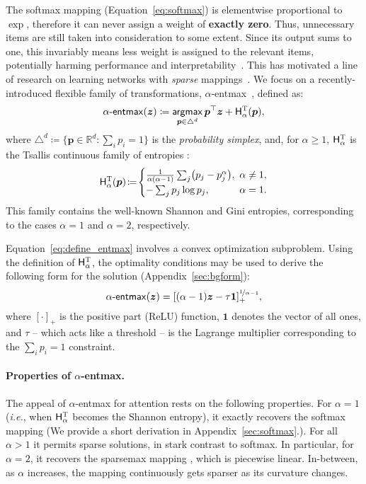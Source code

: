 \documentclass[11pt,a4paper]{article}
\makeatletter
\newcommand*{\ie}{\textit{i.\hspace{.07em}e.}\@\xspace}
\newcommand{\reals}{\mathbb{R}}
\newcommand{\simplex}{\triangle}
\newcommand\pp{p}
\newcommand\p{\bm{\pp}}
\newcommand\xx{z}
\newcommand\x{\bm{\xx}}
\newcommand{\eqnref}[1]{Equation~\ref{eq:#1}}
\newcommand{\HHt}{\mathsf{H}^{\textsc{T}}}
\newcommand{\ones}{\bm{1}}
\newcommand{\appref}[1]{Appendix~\ref{sec:#1}}
\newcommand\thresh{\tau}
\DeclareMathOperator*{\argmax}{\mathsf{argmax}}
\newcommand*\entmaxtext{entmax\xspace}
\newcommand*\aentmax[1][\alpha]{\mathop{\mathsf{#1}\textnormal{-}\mathsf{\entmaxtext}}}
\makeatother
\begin{document}
The softmax mapping (Equation~\ref{eq:softmax}) is elementwise
proportional to $\exp$, therefore it can never assign a weight of
\textbf{exactly zero}. Thus, unnecessary items are still taken into
consideration to some extent. Since its output sums to one, this
invariably means less weight is assigned to the relevant items,
potentially harming performance and
interpretability~\citep{jain2019attention}. This has motivated a line
of research on learning networks with \emph{sparse}
mappings~\citep{sparsemax,fusedmax,louizos,shao2019ssn}. We focus on
a recently-introduced flexible family of transformations,
$\alpha$-\entmaxtext~\citep{blondel2019learning,entmax}, defined as:
\begin{equation}\label{eq:define_entmax}
    \aentmax(\bm{z}) \coloneqq
    \argmax_{\p \in \simplex^d} \bm{p}^\top\bm{z} + \HHt_{\alpha}(\bm{p}),
\end{equation}
where $\simplex^d \coloneqq
\{\p \in \reals^d:\sum_{i} \pp_i = 1\}$
is the \emph{probability simplex}, and, for $\alpha\geq1$,
$\HHt_\alpha$ is the Tsallis continuous family of entropies
\citep{Tsallis1988}:
\begin{equation}\label{eq:tsallisdef}
    \HHt_{\alpha}(\bm{p})\!\coloneqq\!
\begin{cases}
\frac{1}{\alpha(\alpha-1)}\sum_j\!\left(p_j - p_j^\alpha\right)\!, &
\!\!\!\alpha \ne 1,\\
-\sum_j \pp_j \log \pp_j, &
\!\!\!\alpha = 1.
\end{cases}
\end{equation}
This family contains the well-known Shannon and Gini entropies,
corresponding to the cases $\alpha=1$ and $\alpha=2$, respectively.

\eqnref{define_entmax} involves a convex optimization subproblem. Using the
definition of $\HHt_\alpha$, the optimality conditions may be used to derive the
following form for the solution (\appref{bgform}):
\begin{equation}\label{eq:entmax_form}
\aentmax(\x) = [(\alpha - 1){\x} - \thresh \ones]_+^{\nicefrac{1}{\alpha-1}},
\end{equation}
where $[\cdot]_+$ is
the positive part (ReLU) function, $\bm{1}$ denotes the vector of all ones, and
$\thresh$ -- which acts like a threshold -- is the Lagrange multiplier
corresponding to the $\sum_i \pp_i=1$ constraint.

\paragraph{Properties of {\boldmath $\alpha$}-\entmaxtext.}
The appeal of $\alpha$-\entmaxtext for attention rests on the
following properties. For $\alpha=1$ (\ie, when $\HHt_\alpha$ becomes
the Shannon entropy), it exactly recovers the softmax mapping (We
provide a short derivation in \appref{softmax}.). For all $\alpha>1$
it permits sparse solutions, in stark contrast to softmax. In
particular, for $\alpha=2$, it recovers the sparsemax mapping
\citep{sparsemax}, which is piecewise linear. In-between, as $\alpha$
increases, the mapping continuously gets sparser as its curvature
changes.
\end{document}
